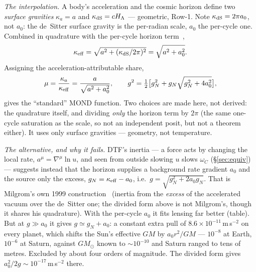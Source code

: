 \documentclass[11pt]{article}
\begin{document}
\emph{The interpolation.} A body's acceleration and the cosmic horizon define two \emph{surface gravities}
$\kappa_a=a$ and $\kappa_{\rm dS}=cH_\Lambda$ --- geometric, Row-1. Note $\kappa_{\rm dS}=2\pi a_0$, not $a_0$: the
de~Sitter surface gravity is the per-radian scale, $a_0$ the per-cycle one. Combined in quadrature with the
per-cycle horizon term~\cite{DeserLevin1997},
\[
\kappa_{\rm eff}=\sqrt{a^2+(\kappa_{\rm dS}/2\pi)^2}=\sqrt{a^2+a_0^2}.
\]
Assigning the acceleration-attributable share,
\[
\mu=\frac{\kappa_a}{\kappa_{\rm eff}}=\frac{a}{\sqrt{a^2+a_0^2}},\qquad g^2=\tfrac12\big[g_N^2+g_N\sqrt{g_N^2+4a_0^2}\big],
\]
gives the ``standard'' MOND function. Two choices are made here, not derived: the quadrature itself, and
dividing \emph{only} the horizon term by $2\pi$ (the same one-cycle saturation as the scale, so not an independent
posit, but not a theorem either). It uses only surface gravities --- geometry, not temperature.

\emph{The alternative, and why it fails.} DTF's inertia --- a force acts by changing the local rate,
$a^\mu=\nabla^\mu\ln u$, and seen from outside slowing $u$ slows $\omega_C$ (\S\ref{sec:equiv}) --- suggests instead that
the horizon supplies a background rate gradient $a_0$ and the source only the excess,
$g_N=\kappa_{\rm eff}-a_0$, i.e.\ $g=\sqrt{g_N^2+2a_0g_N}$. That is Milgrom's own 1999 construction~\cite{Milgrom1999}
(inertia from the \emph{excess} of the accelerated vacuum over the de~Sitter one; the divided form above is not
Milgrom's, though it shares his quadrature). With the per-cycle $a_0$ it fits lensing far better (table). But at
$g\gg a_0$ it gives $g\simeq g_N+a_0$: a constant extra pull of $8.6\times10^{-11}$\,m\,s$^{-2}$ on every planet,
which shifts the Sun's effective $GM$ by $a_0r^2/GM$ --- $10^{-8}$ at Earth, $10^{-6}$ at Saturn, against $GM_\odot$
known to $\sim\!10^{-10}$ and Saturn ranged to tens of metres. Excluded by about four orders of magnitude. The divided
form gives $a_0^2/2g\sim10^{-17}$\,m\,s$^{-2}$ there.
\end{document}
